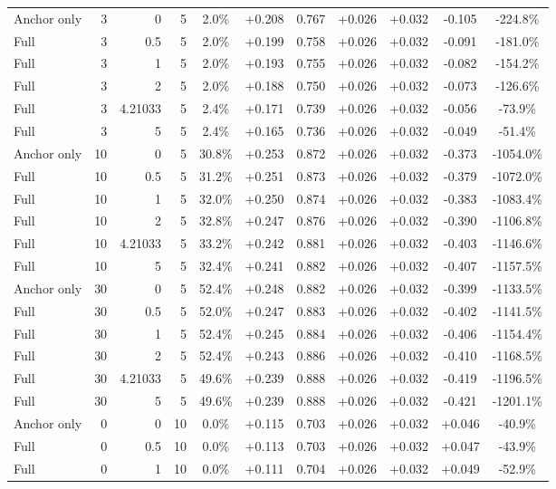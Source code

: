 \begin{table}[htbp]
\begin{tabular}{lrrrccccccc}
Anchor only & 3 & 0 & 5 & 2.0\% & +0.208 & 0.767 & +0.026 & +0.032 & -0.105 & -224.8\% \\
Full & 3 & 0.5 & 5 & 2.0\% & +0.199 & 0.758 & +0.026 & +0.032 & -0.091 & -181.0\% \\
Full & 3 & 1 & 5 & 2.0\% & +0.193 & 0.755 & +0.026 & +0.032 & -0.082 & -154.2\% \\
Full & 3 & 2 & 5 & 2.0\% & +0.188 & 0.750 & +0.026 & +0.032 & -0.073 & -126.6\% \\
Full & 3 & 4.21033 & 5 & 2.4\% & +0.171 & 0.739 & +0.026 & +0.032 & -0.056 & -73.9\% \\
Full & 3 & 5 & 5 & 2.4\% & +0.165 & 0.736 & +0.026 & +0.032 & -0.049 & -51.4\% \\
Anchor only & 10 & 0 & 5 & 30.8\% & +0.253 & 0.872 & +0.026 & +0.032 & -0.373 & -1054.0\% \\
Full & 10 & 0.5 & 5 & 31.2\% & +0.251 & 0.873 & +0.026 & +0.032 & -0.379 & -1072.0\% \\
Full & 10 & 1 & 5 & 32.0\% & +0.250 & 0.874 & +0.026 & +0.032 & -0.383 & -1083.4\% \\
Full & 10 & 2 & 5 & 32.8\% & +0.247 & 0.876 & +0.026 & +0.032 & -0.390 & -1106.8\% \\
Full & 10 & 4.21033 & 5 & 33.2\% & +0.242 & 0.881 & +0.026 & +0.032 & -0.403 & -1146.6\% \\
Full & 10 & 5 & 5 & 32.4\% & +0.241 & 0.882 & +0.026 & +0.032 & -0.407 & -1157.5\% \\
Anchor only & 30 & 0 & 5 & 52.4\% & +0.248 & 0.882 & +0.026 & +0.032 & -0.399 & -1133.5\% \\
Full & 30 & 0.5 & 5 & 52.0\% & +0.247 & 0.883 & +0.026 & +0.032 & -0.402 & -1141.5\% \\
Full & 30 & 1 & 5 & 52.4\% & +0.245 & 0.884 & +0.026 & +0.032 & -0.406 & -1154.4\% \\
Full & 30 & 2 & 5 & 52.4\% & +0.243 & 0.886 & +0.026 & +0.032 & -0.410 & -1168.5\% \\
Full & 30 & 4.21033 & 5 & 49.6\% & +0.239 & 0.888 & +0.026 & +0.032 & -0.419 & -1196.5\% \\
Full & 30 & 5 & 5 & 49.6\% & +0.239 & 0.888 & +0.026 & +0.032 & -0.421 & -1201.1\% \\
Anchor only & 0 & 0 & 10 & 0.0\% & +0.115 & 0.703 & +0.026 & +0.032 & +0.046 & -40.9\% \\
Full & 0 & 0.5 & 10 & 0.0\% & +0.113 & 0.703 & +0.026 & +0.032 & +0.047 & -43.9\% \\
Full & 0 & 1 & 10 & 0.0\% & +0.111 & 0.704 & +0.026 & +0.032 & +0.049 & -52.9\% \\

\end{tabular}
\end{table}
